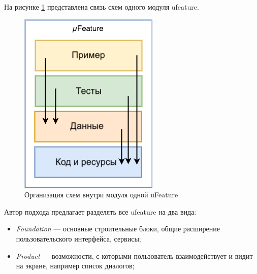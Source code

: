 На рисунке \ref{sec:analysis:research:mobArch:ufeature:featureDependencyDiagram} представлена связь схем одного модуля \gls{ufeature}.

\begin{figure}[h]
  \centering
    \includegraphics{inc/img/ufeature-diagram.png}
  \caption{Организация схем внутри модуля одной uFeature}
  \label{sec:analysis:research:mobArch:ufeature:featureDependencyDiagram}
\end{figure}

Автор подхода предлагает разделять все \gls{ufeature} на два вида:

\begin{itemize}
	\item \emph{Foundation} --- основные строительные блоки, общие расширение пользовательского интерфейса, сервисы;
	\item \emph{Product} --- возможности, с которыми пользователь взаимодействует и видит на экране, например список диалогов;
\end{itemize}

